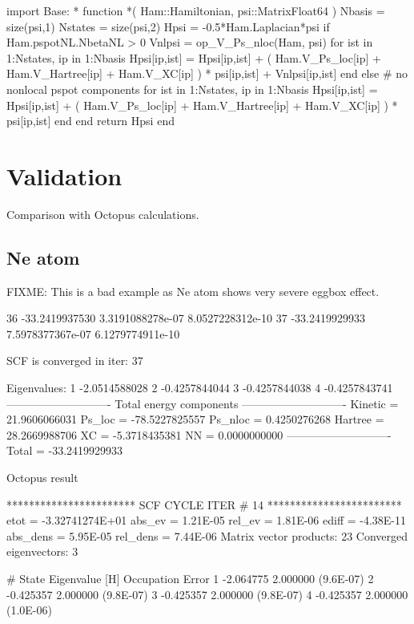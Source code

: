 \begin{juliacode}
import Base: *
function *( Ham::Hamiltonian, psi::Matrix{Float64} )
  Nbasis = size(psi,1)
  Nstates = size(psi,2)
  Hpsi = -0.5*Ham.Laplacian*psi
  if Ham.pspotNL.NbetaNL > 0
    Vnlpsi = op_V_Ps_nloc(Ham, psi)
    for ist in 1:Nstates, ip in 1:Nbasis
        Hpsi[ip,ist] = Hpsi[ip,ist] + ( Ham.V_Ps_loc[ip] +
            Ham.V_Hartree[ip] + Ham.V_XC[ip] ) * psi[ip,ist] + Vnlpsi[ip,ist]
    end
  else # no nonlocal pspot components
    for ist in 1:Nstates, ip in 1:Nbasis
            Hpsi[ip,ist] = Hpsi[ip,ist] + ( Ham.V_Ps_loc[ip] +
                Ham.V_Hartree[ip] + Ham.V_XC[ip] ) * psi[ip,ist]
    end
  end
  return Hpsi
end
\end{juliacode}

\section{Validation}

Comparison with Octopus calculations.

\subsection{Ne atom}

FIXME: This is a bad example as Ne atom shows very severe eggbox effect.

\begin{textcode}
   36     -33.2419937530   3.3191088278e-07   8.0527228312e-10
   37     -33.2419929933   7.5978377367e-07   6.1279774911e-10

SCF is converged in iter: 37
 
Eigenvalues:
  1      -2.0514588028
  2      -0.4257844044
  3      -0.4257844038
  4      -0.4257843741
----------------------------
Total energy components
----------------------------
Kinetic =      21.9606066031
Ps_loc  =     -78.5227825557
Ps_nloc =       0.4250276268
Hartree =      28.2669988706
XC      =      -5.3718435381
NN      =       0.0000000000
----------------------------
Total   =     -33.2419929933 
\end{textcode}

Octopus result
\begin{textcode}
 *********************** SCF CYCLE ITER #   14 ************************
 etot  = -3.32741274E+01 abs_ev   =  1.21E-05 rel_ev   =  1.81E-06
 ediff =       -4.38E-11 abs_dens =  5.95E-05 rel_dens =  7.44E-06
Matrix vector products:     23
Converged eigenvectors:      3

#  State  Eigenvalue [H]  Occupation    Error
      1       -2.064775    2.000000   (9.6E-07)
      2       -0.425357    2.000000   (9.8E-07)
      3       -0.425357    2.000000   (9.8E-07)
      4       -0.425357    2.000000   (1.0E-06)   
\end{textcode}

